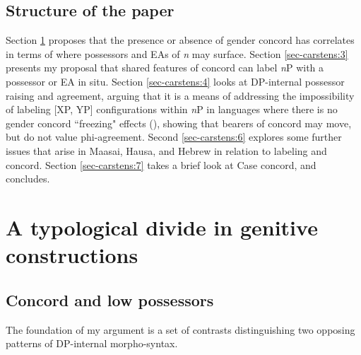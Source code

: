 \documentclass[output=paper
,modfonts
,nonflat]{langsci/langscibook}
\begin{document}
\subsection{Structure of the paper} \label{sec-carstens:1.5}
Section \ref{sec-carstens:2} proposes that the presence or absence of gender concord has correlates in terms of where possessors and EAs of \textit{n} may surface. Section \ref{sec-carstens:3} presents my proposal that shared features of concord can label \textit{n}P with a possessor or EA in situ. Section \ref{sec-carstens:4} looks at DP-internal possessor raising and agreement, arguing that it is a means of addressing the impossibility of labeling [XP, YP] configurations within \textit{n}P in languages where there is no gender concord ``freezing" effects (\citealt{Rizzi2006,Rizzi_Shlonsky2007}), showing that bearers of concord may move, but do not value phi-agreement. Second \ref{sec-carstens:6} explores some further issues that arise in Maasai, Hausa, and Hebrew in relation to labeling and concord. Section \ref{sec-carstens:7} takes a brief look at Case concord, and  concludes.

\section{A typological divide in genitive constructions} \label{sec-carstens:2}
\subsection{Concord and low possessors} \label{sec-carstens:2.1}
The foundation of my argument is a set of contrasts distinguishing two opposing patterns of DP-internal morpho-syntax.
\end{document}
